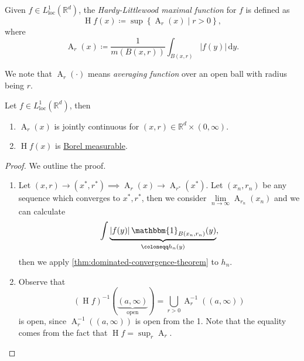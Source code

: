 \begin{definition}\label{def:HL-maximal-function}
	Given \(f\in L^1_{\text{loc} }(\mathbb{R} ^d)\), the \emph{Hardy-Littlewood maximal function} for \(f\) is defined as
	\[
		\operatorname{H}f(x) \coloneqq \sup \left\{\operatorname{A}_r(x)\mid r > 0\right\},
	\]
	where
	\[
		\operatorname{A}_r(x) \coloneqq \frac{1}{m(B(x, r))}\int _{B(x, r)} \left\vert f(y) \right\vert \,\mathrm{d}y.
	\]
\end{definition}
\begin{note}
	We note that \(\operatorname{A}_r(\cdot) \) means \emph{averaging function} over an open ball with radius being \(r\).
\end{note}
\begin{lemma}\label{lma:lec21}
	Let \(f\in L^1_{\text{loc} }(\mathbb{R} ^d)\), then
	\begin{enumerate}[(1)]
		\item \(\operatorname{A}_r(x)\) is jointly continuous for \((x, r)\in \mathbb{R} ^d \times (0, \infty )\).
		\item \(\operatorname{H}f(x) \) is \hyperref[def:Borel-measurable-function]{Borel measurable}.
	\end{enumerate}
\end{lemma}
\begin{proof}
	We outline the proof.
	\begin{enumerate}[(1)]
		\item Let \((x, r)\to (x^\ast, r^\ast)\implies \operatorname{A}_r(x)\to \operatorname{A}_{r^\ast}(x^\ast)\). Let \((x_{n} , r_{n} )\) be any sequence which converges to
		      \(x^\ast, r^\ast\), then we consider \(\lim\limits_{n \to \infty} \operatorname{A}_{r_{n} }(x_{n} )\) and we can calculate
		      \[
			      \int\underbrace{\left\vert f(y) \right\vert \mathbbm{1}_{B(x_{n} , r_{n} )} (y)}_{\coloneqq h_{n} (y)},
		      \]
		      then we apply \autoref{thm:dominated-convergence-theorem} to \(h_{n} \).
		\item Observe that
		      \[
			      (\operatorname{H}f)^{-1} (\underbrace{(a, \infty )}_{\text{open} }) = \bigcup\limits_{r>0} \operatorname{A}_{r} ^{-1} \left((a, \infty )\right)
		      \]
		      is open, since \(\operatorname{A} _{r} ^{-1} \left((a, \infty )\right)\) is open from the 1. Note that the equality comes from the fact that \(\operatorname{H}f = \sup_{r} \operatorname{A} _{r} \).
	\end{enumerate}
\end{proof}

